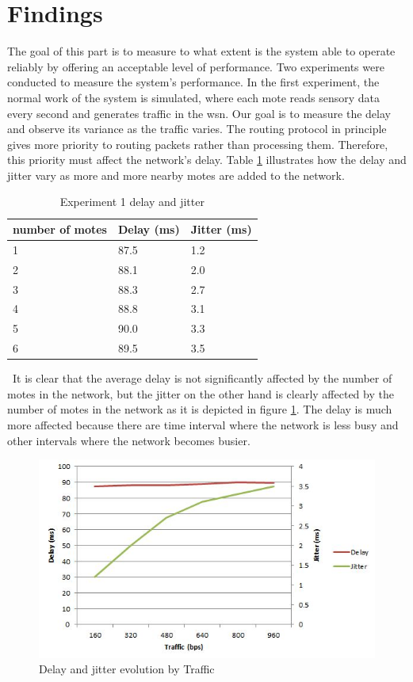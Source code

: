 \documentclass[conference]{IEEEtran}
\begin{document}
\section{Findings}
The goal of this part is to measure to what extent is the system able to operate reliably by offering an acceptable level of performance. Two experiments were conducted to measure the system's performance. In the first experiment, the normal work of the system is simulated, where each mote reads sensory data every second and generates traffic in the \gls{wsn}. Our goal is to measure the delay and observe its variance as the traffic varies. The routing protocol in principle gives more priority to routing packets rather than processing them. Therefore, this priority must affect the network's delay. Table \ref{table:exp1} illustrates how the delay and jitter vary as more and more nearby motes are added to the network.
\begin{table}[htbp]
    \begin{tabular}{lll}
    \hline
    number of motes & Delay (ms) & Jitter (ms) \\\hline
    1               & 87.5         & 1.2         \\ 
    2               & 88.1         & 2.0         \\
    3               & 88.3        & 2.7         \\
    4               & 88.8         & 3.1         \\
    5               & 90.0         & 3.3         \\
    6               & 89.5         & 3.5         \\
    \end{tabular}
    \caption{Experiment 1 delay and jitter}
    \label{table:exp1}
\end{table}

\
It is clear that the average delay is not significantly affected by the number of motes in the network, but the jitter on the other hand is clearly affected by the number of motes in the network as it is depicted in figure \ref{fig:delay_jitter}. The delay is much more affected because there are time interval where the network is less busy and other intervals where the network becomes busier.
\begin{figure}[htbp]
\centering
\includegraphics[scale=0.6]{images/delay_jitter.JPG}
\caption{Delay and jitter evolution by Traffic}
\label{fig:delay_jitter}
\end{figure}
\end{document}
